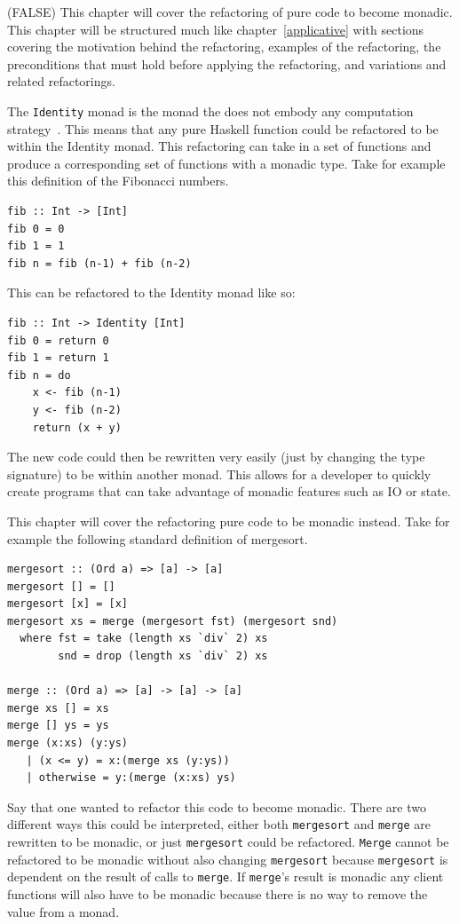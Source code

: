 \if(FALSE)
This chapter will cover the refactoring of pure code to become monadic. This chapter will be structured much like chapter~\ref{applicative} with sections covering the motivation behind the refactoring, examples of the refactoring, the preconditions that must hold before applying the refactoring, and variations and related refactorings. 

The \texttt{Identity} monad is the monad the does not embody any computation strategy~\citep{identityMonad}. This means that any pure Haskell function could be refactored to be within the Identity monad. This refactoring can take in a set of functions and produce a corresponding set of functions with a monadic type. Take for example this definition of the Fibonacci numbers.

\begin{lstlisting}[frame=tblr]
fib :: Int -> [Int]
fib 0 = 0
fib 1 = 1
fib n = fib (n-1) + fib (n-2)
\end{lstlisting} 

This can be refactored to the Identity monad like so:

\begin{lstlisting}[frame=tblr]
fib :: Int -> Identity [Int]
fib 0 = return 0
fib 1 = return 1
fib n = do
	x <- fib (n-1)
	y <- fib (n-2)
	return (x + y)
\end{lstlisting}

The new code could then be rewritten very easily (just by changing the type signature) to be within another monad. This allows for a developer to quickly create programs that can take advantage of monadic features such as IO or state.



This chapter will cover the refactoring pure code to be monadic instead. Take for example the following standard definition of mergesort.

\begin{lstlisting}[frame=tblr]
mergesort :: (Ord a) => [a] -> [a]
mergesort [] = []
mergesort [x] = [x]
mergesort xs = merge (mergesort fst) (mergesort snd)
  where fst = take (length xs `div` 2) xs
        snd = drop (length xs `div` 2) xs

merge :: (Ord a) => [a] -> [a] -> [a]
merge xs [] = xs
merge [] ys = ys
merge (x:xs) (y:ys)
   | (x <= y) = x:(merge xs (y:ys))
   | otherwise = y:(merge (x:xs) ys)
\end{lstlisting}

Say that one wanted to refactor this code to become monadic. There are two different ways this could be interpreted, either both \texttt{mergesort} and \texttt{merge} are rewritten to be monadic, or just \texttt{mergesort} could be refactored. \texttt{Merge} cannot be refactored to be monadic without also changing \texttt{mergesort} because \texttt{mergesort} is dependent on the result of calls to \texttt{merge}. If \texttt{merge}'s result is monadic any client functions will also have to be monadic because there is no way to remove the value from a monad. 

